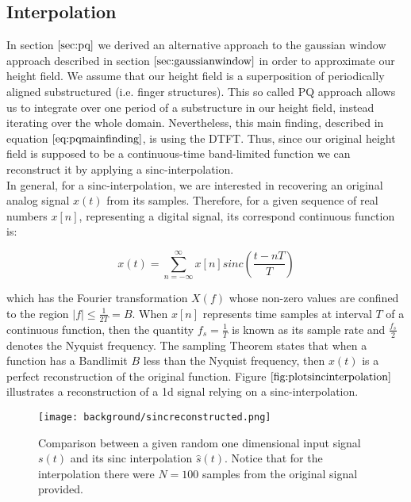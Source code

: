 \subsection{Interpolation}
\label{sec:sincinterpolation}
In section $\ref{sec:pq}$ we derived an alternative approach to the gaussian window approach described in section $\ref{sec:gaussianwindow}$ in order to approximate our height field. We assume that our height field is a superposition of periodically aligned substructured (i.e. finger structures). This so called PQ approach allows us to integrate over one period of a substructure in our height field, instead iterating over the whole domain. Nevertheless, this main finding, described in equation $\ref{eq:pqmainfinding}$, is using the DTFT. Thus, since our original height field is supposed to be a continuous-time band-limited function we can reconstruct it by applying a sinc-interpolation. \\

In general, for a sinc-interpolation, we are interested in recovering an original analog signal $x(t)$ from its samples. Therefore, for a given sequence of real numbers $x[n]$, representing a digital signal, its correspond continuous function is: 

\begin{equation}
  x(t) = \sum_{n=-\infty}^{\infty} x[n] sinc\left(\frac{t-nT}{T}\right)
\end{equation}

which has the Fourier transformation $X(f)$ whose non-zero values are confined to the region $|f| \leq \frac{1}{2T} = B$.
When $x[n]$ represents time samples at interval $T$ of a continuous function, then the quantity $f_s = \frac{1}{T}$ is known as its sample rate and $\frac{f_s}{2}$ denotes the Nyquist frequency. The sampling Theorem states that when a function has a Bandlimit $B$ less than the Nyquist frequency, then $x(t)$ is a perfect reconstruction of the original function. Figure $\ref{fig:plotsincinterpolation}$ illustrates a reconstruction of a 1d signal relying on a sinc-interpolation.  

\begin{figure}[ht]
  \centering
  \texttt{[image: background/sincreconstructed.png]}
  \caption[Sinc Interpolation Approximation]{Comparison between a given random one dimensional input signal $s(t)$ and its sinc interpolation $\hat{s}(t)$. Notice that for the interpolation there were $N=100$ samples from the original signal provided.}
  \label{fig:plotsincinterpolation}  
\end{figure}

